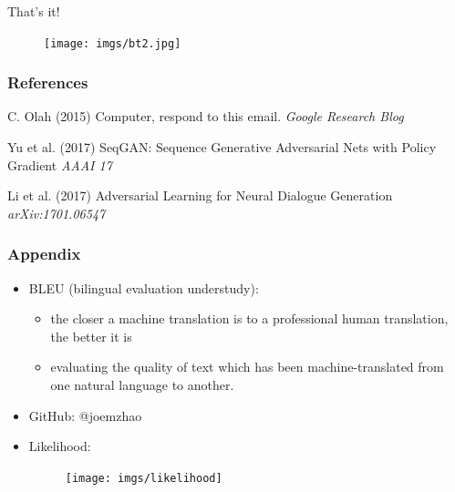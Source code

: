 \documentclass{beamer}
\begin{document}

\begin{frame}
\vspace{3cm}
\Huge{\centerline{That's it!}}
\begin{figure}
\hspace{-7cm}
\vspace{-1cm}
\texttt{[image: imgs/bt2.jpg]}
\end{figure}
\end{frame}

\begin{frame}
\frametitle{References}
\footnotesize{
\begin{thebibliography}{99} %

 C. Olah (2015)
\newblock Computer, respond to this email.
\newblock \emph{Google Research Blog}

 Yu et al. (2017)
\newblock SeqGAN: Sequence Generative Adversarial Nets with Policy Gradient 
\newblock \emph{AAAI 17}

 Li et al. (2017)
\newblock Adversarial Learning for Neural Dialogue Generation
\newblock \emph{arXiv:1701.06547}

\end{thebibliography}
}
\end{frame}


\begin{frame}
\frametitle{Appendix}
\begin{itemize}
\item BLEU (bilingual evaluation understudy):
	\begin{itemize}
 		\item the closer a machine translation is to a professional human translation, the better it is
 		\item evaluating the quality of text which has been machine-translated from one natural language to another. 
 	\end{itemize}
 \item GitHub: @joemzhao
 \item Likelihood:
		 \begin{figure}
			\centering
			\texttt{[image: imgs/likelihood]}
		\end{figure}
\end{itemize}
\end{frame}
\end{document}
